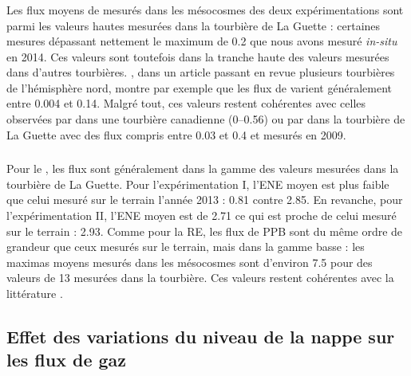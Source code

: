 \subsubsection{\chh}

Les flux moyens de \chh mesurés dans les mésocosmes des deux expérimentations sont parmi les valeurs hautes mesurées dans la tourbière de La Guette : certaines mesures dépassant nettement le maximum de \SI{0.2}{\uml} que nous avons mesuré \textit{in-situ} en 2014.
Ces valeurs sont toutefois dans la tranche haute des valeurs mesurées dans d'autres tourbières.
\citet{blodau2002}, dans un article passant en revue plusieurs tourbières de l'hémisphère nord, montre par exemple que les flux de \chh varient généralement entre \num{0.004} et \SI{0.14}{\uml}.
Malgré tout, ces valeurs restent cohérentes avec celles observées par \citet{lai2014} dans une tourbière canadienne (\num{0}--\SI{0.56}{\uml}) ou par \citet{gogo2011} dans la tourbière de La Guette avec des flux compris entre \num{0.03} et \SI{0.4}{\uml} et mesurés en 2009.

\subsubsection{\coo}

Pour le \coo, les flux sont généralement dans la gamme des valeurs mesurées dans la tourbière de La Guette.
Pour l'expérimentation I, l'ENE moyen est plus faible que celui mesuré sur le terrain l'année 2013 : \num{0.81} contre \SI{2.85}{\uml}.
En revanche, pour l'expérimentation II, l'ENE moyen est de \SI{2.71}{\uml} ce qui est proche de celui mesuré sur le terrain : \SI{2.93}{\uml}.
Comme pour la RE, les flux de PPB sont du même ordre de grandeur que ceux mesurés sur le terrain, mais dans la gamme basse : les maximas moyens mesurés dans les mésocosmes sont d'environ \num{7.5} pour des valeurs de \SI{13}{\uml} mesurées dans la tourbière.
Ces valeurs restent cohérentes avec la littérature \citep{bortoluzzi2006a}.

%



\subsection{Effet des variations du niveau de la nappe sur les flux de gaz}

